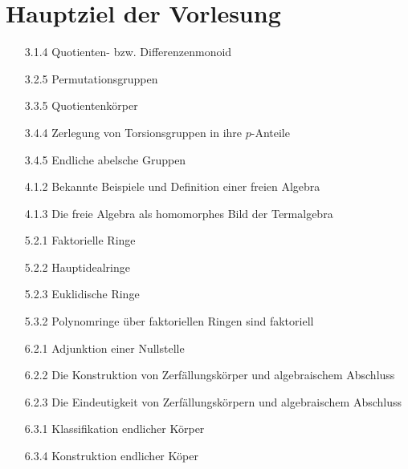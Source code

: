 \section{Hauptziel der Vorlesung}

\begin{itemize}

  \item
  [3.1.4]
  Quotienten- bzw. Differenzenmonoid

  \item
  [3.2.5]
  Permutationsgruppen

  \item
  [3.3.5]
  Quotientenkörper

  \item
  [3.4.4]
  Zerlegung von Torsionsgruppen in ihre $p$-Anteile

  \item
  [3.4.5]
  Endliche abelsche Gruppen

  \item
  [4.1.2]
  Bekannte Beispiele und Definition einer freien Algebra

  \item
  [4.1.3]
  Die freie Algebra als homomorphes Bild der Termalgebra

  \item
  [5.2.1]
  Faktorielle Ringe

  \item
  [5.2.2]
  Hauptidealringe

  \item
  [5.2.3]
  Euklidische Ringe

  \item
  [5.3.2]
  Polynomringe über faktoriellen Ringen sind faktoriell

  \item
  [6.2.1]
  Adjunktion einer Nullstelle

  \item
  [6.2.2]
  Die Konstruktion von Zerfällungskörper und algebraischem Abschluss

  \item
  [6.2.3]
  Die Eindeutigkeit von Zerfällungskörpern und algebraischem Abschluss

  \item
  [6.3.1]
  Klassifikation endlicher Körper

  \item
  [6.3.4]
  Konstruktion endlicher Köper

\end{itemize}
